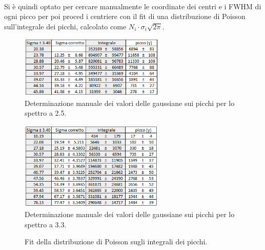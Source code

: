 \documentclass[11pt]{article} %
\begin{document}
\\ Si è quindi optato per cercare manualmente le coordinate dei centri e i FWHM di ogni picco per poi proced i centriere con il fit di una distribuzione di Poisson sull'integrale dei picchi, calcolato come $N_i\cdot\sigma_i \sqrt{2\pi}$. 
\begin{figure}[h!]
\begin{center}
\includegraphics[width=260px]{img/tabp25.PNG}
\caption{Determinazione manuale dei valori delle gaussiane sui picchi per lo spettro a 2.5.}
\label{fig:tabpicchi25}
\end{center}
\end{figure}
\begin{figure}[h!]
\begin{center}
\vspace{-41pt}
\includegraphics[width=260px]{img/tabp33.PNG}
\caption{Determinazione manuale dei valori delle gaussiane sui picchi per lo spettro a 3.3.}
\label{fig:tabpicchi25}
\end{center}
\end{figure}
\newpage
\begin{figure}[!h]
\centering
\caption{Fit della distribuzione di Poisson sugli integrali dei picchi.}
\end{figure}
\end{document}
